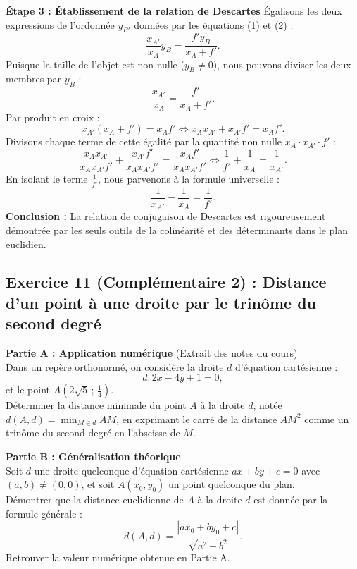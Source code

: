 \documentclass[11pt,a4paper]{article}
\begin{document}
\begin{correctionbox}
\textbf{Étape 3 : Établissement de la relation de Descartes}
Égalisons les deux expressions de l'ordonnée $y_{B'}$ données par les équations (1) et (2) :
\[
\frac{x_{A'}}{x_A} y_B = \frac{f' y_B}{x_A + f'}.
\]
Puisque la taille de l'objet est non nulle ($y_B \neq 0$), nous pouvons diviser les deux membres par $y_B$ :
\[
\frac{x_{A'}}{x_A} = \frac{f'}{x_A + f'}.
\]
Par produit en croix :
\[
x_{A'}(x_A + f') = x_A f' \iff x_A x_{A'} + x_{A'} f' = x_A f'.
\]
Divisons chaque terme de cette égalité par la quantité non nulle $x_A \cdot x_{A'} \cdot f'$ :
\[
\frac{x_A x_{A'}}{x_A x_{A'} f'} + \frac{x_{A'} f'}{x_A x_{A'} f'} = \frac{x_A f'}{x_A x_{A'} f'} \iff \frac{1}{f'} + \frac{1}{x_A} = \frac{1}{x_{A'}}.
\]
En isolant le terme $\frac{1}{f'}$, nous parvenons à la formule universelle :
\[
\frac{1}{x_{A'}} - \frac{1}{x_A} = \frac{1}{f'}.
\]
\textbf{Conclusion :} La relation de conjugaison de Descartes est rigoureusement démontrée par les seuls outils de la colinéarité et des déterminants dans le plan euclidien.
\end{correctionbox}

\vspace{0.6cm}
\subsection*{Exercice 11 (Complémentaire 2) : Distance d'un point à une droite par le trinôme du second degré}

\begin{enoncebox}
\textbf{Partie A : Application numérique} (Extrait des notes du cours)\\
Dans un repère orthonormé, on considère la droite $d$ d'équation cartésienne :
\[
d : 2x - 4y + 1 = 0,
\]
et le point $A\left(2\sqrt{5} \,;\, \frac{1}{4}\right)$.\\
Déterminer la distance minimale du point $A$ à la droite $d$, notée $d(A, d) = \min_{M \in d} AM$, en exprimant le carré de la distance $AM^2$ comme un trinôme du second degré en l'abscisse de $M$.

\vspace{0.2cm}
\textbf{Partie B : Généralisation théorique}\\
Soit $d$ une droite quelconque d'équation cartésienne $ax + by + c = 0$ avec $(a, b) \neq (0, 0)$, et soit $A(x_0, y_0)$ un point quelconque du plan.\\
Démontrer que la distance euclidienne de $A$ à la droite $d$ est donnée par la formule générale :
\[
d(A, d) = \frac{|a x_0 + b y_0 + c|}{\sqrt{a^2 + b^2}}.
\]
Retrouver la valeur numérique obtenue en Partie A.
\end{enoncebox}
\end{document}
